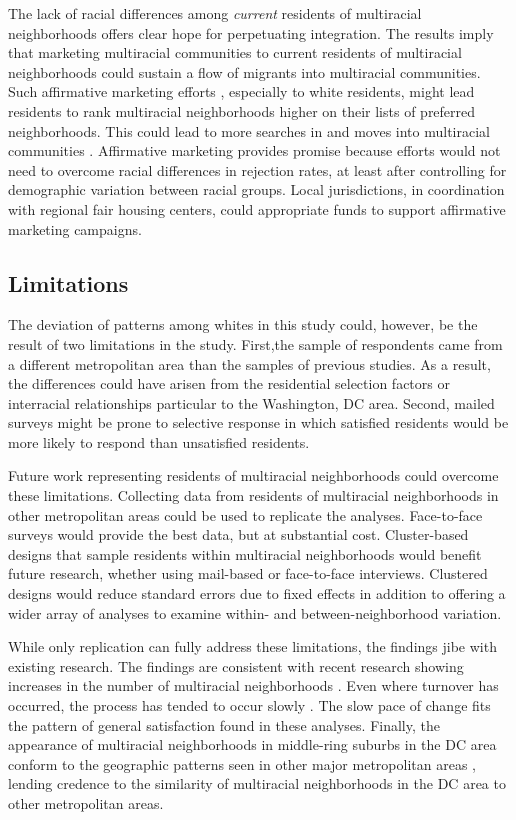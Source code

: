 \documentclass{baderart}
\begin{document}
The lack of racial differences among \emph{current} residents of multiracial neighborhoods offers clear hope for perpetuating integration. The results imply that marketing multiracial communities to current residents of multiracial neighborhoods could sustain a flow of migrants into multiracial communities. Such affirmative marketing efforts \citep{haberle_accessing_2012}, especially to white residents, might lead residents to rank multiracial neighborhoods higher on their lists of preferred neighborhoods. This could lead to more searches in and moves into multiracial communities \citep{krysan_cycle_2017}. Affirmative marketing provides promise because efforts would not need to overcome racial differences in rejection rates, at least after controlling for demographic variation between racial groups. Local jurisdictions, in coordination with regional fair housing centers, could appropriate funds to support affirmative marketing campaigns. 

\subsection{Limitations}
The deviation of patterns among whites in this study could, however, be the result of two limitations in the study. First,the sample of respondents came from a different metropolitan area than the samples of previous studies. As a result, the differences could have arisen from the residential selection factors or interracial relationships particular to the Washington, DC area. Second, mailed surveys might be prone to selective response in which satisfied residents would be more likely to respond than unsatisfied residents. 

Future work representing residents of multiracial neighborhoods could overcome these limitations. Collecting data from residents of multiracial neighborhoods in other metropolitan areas could be used to replicate the analyses. Face-to-face surveys would provide the best data, but at substantial cost. Cluster-based designs that sample residents within multiracial neighborhoods would benefit future research, whether using mail-based or face-to-face interviews. Clustered designs would reduce standard errors due to fixed effects in addition to offering a wider array of analyses to examine within- and between-neighborhood variation.

While only replication can fully address these limitations, the findings jibe with existing research. The findings are consistent with recent research showing increases in the number of multiracial neighborhoods \citep{friedman_declines_2008, logan_global_2010, bader_fragmented_2016}. Even where turnover has occurred, the process has tended to occur slowly \citep{ellen_sharing_2000}. The slow pace of change fits the pattern of general satisfaction found in these analyses. Finally, the appearance of multiracial neighborhoods in middle-ring suburbs in the DC area conform to the geographic patterns seen in other major metropolitan areas \citep[e.g., ][]{bader_fragmented_2016}, lending credence to the similarity of multiracial neighborhoods in the DC area to other metropolitan areas. 
\end{document}
